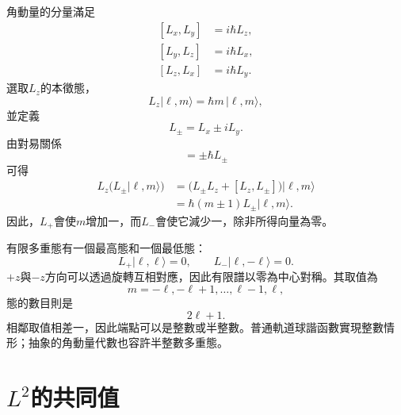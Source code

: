 角動量的分量滿足
\begin{equation}
\begin{aligned}
[L_x,L_y]&=i\hbar L_z,\\
[L_y,L_z]&=i\hbar L_x,\\
[L_z,L_x]&=i\hbar L_y.
\end{aligned}
\end{equation}
選取\(L_z\)的本徵態，
\begin{equation}
L_z|\ell,m\rangle=\hbar m\,|\ell,m\rangle,
\end{equation}
並定義
\begin{equation}
L_\pm=L_x\pm iL_y.
\end{equation}
由對易關係
\begin{equation}
[L_z,L_\pm]=\pm\hbar L_\pm
\end{equation}
可得
\begin{align}
L_z\bigl(L_\pm|\ell,m\rangle\bigr)
&=\bigl(L_\pm L_z+[L_z,L_\pm]\bigr)|\ell,m\rangle \\
&=\hbar(m\pm1)L_\pm|\ell,m\rangle.
\end{align}
因此，\(L_+\)會使\(m\)增加一，而\(L_-\)會使它減少一，除非所得向量為零。

有限多重態有一個最高態和一個最低態：
\begin{equation}
L_+|\ell,\ell\rangle=0,
\qquad
L_-|\ell,-\ell\rangle=0.
\end{equation}
\(+z\)與\(-z\)方向可以透過旋轉互相對應，因此有限譜以零為中心對稱。其取值為
\begin{equation}
m=-\ell,-\ell+1,\ldots,\ell-1,\ell,
\end{equation}
態的數目則是
\begin{equation}
2\ell+1.
\end{equation}
相鄰取值相差一，因此端點可以是整數或半整數。普通軌道球諧函數實現整數情形；抽象的角動量代數也容許半整數多重態。

\begin{classroomqa}
\end{classroomqa}

\section{\texorpdfstring{\(L^2\)}{角動量平方}的共同值}

